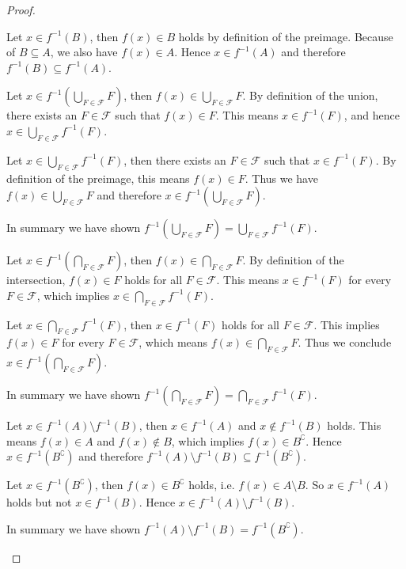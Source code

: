 \begin{proof}
    \begin{proofenumerate}
        \item Let $x \in f^{-1}(B)$, then $f(x) \in B$ holds by definition of the preimage. Because of $B \subseteq A$, we also have $f(x) \in A$. Hence $x \in f^{-1}(A)$ and therefore $f^{-1}(B) \subseteq f^{-1}(A)$.
         
        \item \proofsubset Let $x \in f^{-1}(\bigcup_{F\in\mathcal F}F)$, then $f(x) \in \bigcup_{F\in\mathcal F}F$. By definition of the union, there exists an $F \in \mathcal F$ such that $f(x) \in F$. This means $x \in f^{-1}(F)$, and hence $x \in \bigcup_{F\in\mathcal F}f^{-1}(F)$.
        
        \proofsupset Let $x \in \bigcup_{F\in\mathcal F}f^{-1}(F)$, then there exists an $F \in \mathcal F$ such that $x \in f^{-1}(F)$. By definition of the preimage, this means $f(x) \in F$. Thus we have $f(x) \in \bigcup_{F\in\mathcal F}F$ and therefore $x \in f^{-1}(\bigcup_{F\in\mathcal F}F)$.

        In summary we have shown $f^{-1}(\bigcup_{F\in \mathcal F} F)=\bigcup_{F\in \mathcal F}f^{-1}(F)$.

        \item \proofsubset Let $x \in f^{-1}(\bigcap_{F\in\mathcal F}F)$, then $f(x) \in \bigcap_{F\in\mathcal F}F$. By definition of the intersection, $f(x) \in F$ holds for all $F \in \mathcal F$. This means $x \in f^{-1}(F)$ for every $F \in \mathcal F$, which implies $x \in \bigcap_{F\in\mathcal F}f^{-1}(F)$.
        
        \proofsupset Let $x \in \bigcap_{F\in\mathcal F}f^{-1}(F)$, then $x \in f^{-1}(F)$ holds for all $F \in \mathcal F$. This implies $f(x) \in F$ for every $F \in \mathcal F$, which means $f(x) \in \bigcap_{F\in\mathcal F}F$. Thus we conclude $x \in f^{-1}(\bigcap_{F\in\mathcal F}F)$.

        In summary we have shown $f^{-1}(\bigcap_{F\in \mathcal F} F)=\bigcap_{F\in \mathcal F}f^{-1}(F)$.
        
        \item \proofsubset Let $x \in f^{-1}(A) \setminus f^{-1}(B)$, then $x \in f^{-1}(A)$ and $x \notin f^{-1}(B)$ holds. This means $f(x) \in A$ and $f(x) \notin B$, which implies $f(x) \in B^\complement$. Hence $x \in f^{-1}(B^\complement)$ and therefore $f^{-1}(A) \setminus f^{-1}(B) \subseteq f^{-1}(B^\complement)$.
        
        \proofsupset Let $x \in f^{-1}(B^\complement)$, then $f(x) \in B^\complement$ holds, i.e. $f(x)\in A\setminus B$. So $x\in f^{-1}(A)$ holds but not $x\in f^{-1}(B)$. Hence $x\in f^{-1}(A)\setminus f^{-1}(B)$.

        In summary we have shown $f^{-1}(A)\setminus f^{-1}(B)=f^{-1}(B^\complement)$.
    \end{proofenumerate}
\end{proof}

